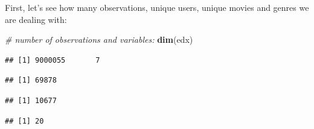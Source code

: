 \documentclass[]{article}
\newenvironment{Shaded}{\begin{snugshade}}{\end{snugshade}}
\newcommand{\KeywordTok}[1]{\textcolor[rgb]{0.13,0.29,0.53}{\textbf{#1}}}
\newcommand{\DataTypeTok}[1]{\textcolor[rgb]{0.13,0.29,0.53}{#1}}
\newcommand{\CharTok}[1]{\textcolor[rgb]{0.31,0.60,0.02}{#1}}
\newcommand{\StringTok}[1]{\textcolor[rgb]{0.31,0.60,0.02}{#1}}
\newcommand{\CommentTok}[1]{\textcolor[rgb]{0.56,0.35,0.01}{\textit{#1}}}
\newcommand{\OperatorTok}[1]{\textcolor[rgb]{0.81,0.36,0.00}{\textbf{#1}}}
\newcommand{\NormalTok}[1]{#1}
\begin{document}
First, let's see how many observations, unique users, unique movies and
genres we are dealing with:

\begin{Shaded}
\begin{Highlighting}[]
\CommentTok{# number of observations and variables:}
\KeywordTok{dim}\NormalTok{(edx)}
\end{Highlighting}
\end{Shaded}

\begin{verbatim}
## [1] 9000055       7
\end{verbatim}

\begin{Shaded}
\end{Shaded}

\begin{verbatim}
## [1] 69878
\end{verbatim}

\begin{Shaded}
\end{Shaded}

\begin{verbatim}
## [1] 10677
\end{verbatim}

\begin{Shaded}
\end{Shaded}

\begin{verbatim}
## [1] 20
\end{verbatim}
\end{document}
